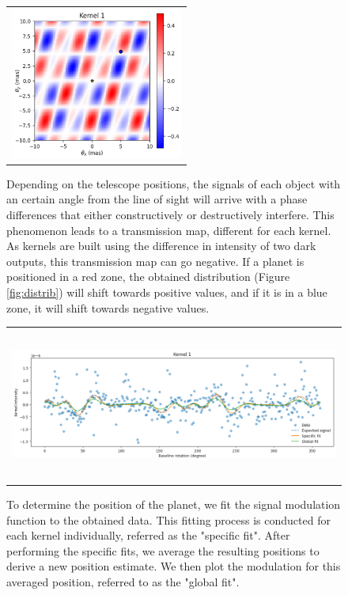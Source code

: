 \documentclass[]{spie}  %
\begin{document}
\begin{figure} [H]
    \begin{center}
    \begin{tabular}{c}
    \includegraphics[height=5cm]{img/transmission_map.png}
    \end{tabular}
    \end{center}
    \caption[transmission_map] 
    { \label{fig:transmission_map} 
    Depending on the telescope positions, the signals of each object with an certain angle from the line of sight will arrive with a phase differences that either constructively or destructively interfere. This phenomenon leads to a transmission map, different for each kernel. As kernels are built using the difference in intensity of two dark outputs, this transmission map can go negative. If a planet is positioned in a red zone, the obtained distribution (Figure \ref{fig:distrib}) will shift towards positive values, and if it is in a blue zone, it will shift towards negative values.}
\end{figure}

\begin{figure} [H]
    \begin{center}
    \begin{tabular}{c}
    \includegraphics[height=5cm]{img/fit.png}
    \end{tabular}
    \end{center}
    \caption[fit] 
    {\label{fig:fit} 
    To determine the position of the planet, we fit the signal modulation function to the obtained data. This fitting process is conducted for each kernel individually, referred as the "specific fit". After performing the specific fits, we average the resulting positions to derive a new position estimate. We then plot the modulation for this averaged position, referred to as the "global fit".}
\end{figure}
\end{document}
